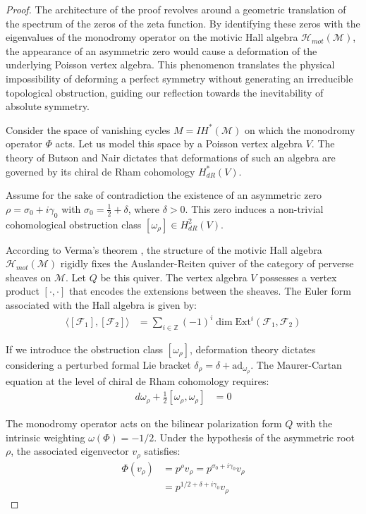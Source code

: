 \documentclass[
]{article}
\begin{document}
\begin{proof}
The architecture of the proof revolves around a geometric translation of the spectrum of the zeros of the zeta function. By identifying these zeros with the eigenvalues of the monodromy operator on the motivic Hall algebra $\mathcal{H}_{mot}(\mathcal{M})$, the appearance of an asymmetric zero would cause a deformation of the underlying Poisson vertex algebra. This phenomenon translates the physical impossibility of deforming a perfect symmetry without generating an irreducible topological obstruction, guiding our reflection towards the inevitability of absolute symmetry.

Consider the space of vanishing cycles $M = IH^*(\mathcal{M})$ on which the monodromy operator $\Phi$ acts. Let us model this space by a Poisson vertex algebra $V$. The theory of Butson and Nair dictates that deformations of such an algebra are governed by its chiral de Rham cohomology $H^*_{dR}(V)$.

Assume for the sake of contradiction the existence of an asymmetric zero $\rho = \sigma_0 + i \gamma_0$ with $\sigma_0 = \frac{1}{2} + \delta$, where $\delta > 0$. This zero induces a non-trivial cohomological obstruction class $[\omega_\rho] \in H^2_{dR}(V)$.

According to Verma's theorem \cite{verma2026}, the structure of the motivic Hall algebra $\mathcal{H}_{mot}(\mathcal{M})$ rigidly fixes the Auslander-Reiten quiver of the category of perverse sheaves on $\mathcal{M}$. Let $Q$ be this quiver. The vertex algebra $V$ possesses a vertex product $[ \cdot, \cdot ]$ that encodes the extensions between the sheaves. The Euler form associated with the Hall algebra is given by:
\begin{align*}
    \langle [\mathcal{F}_1], [\mathcal{F}_2] \rangle &= \sum_{i \in \mathbb{Z}} (-1)^i \dim \text{Ext}^i(\mathcal{F}_1, \mathcal{F}_2)
\end{align*}

If we introduce the obstruction class $[\omega_\rho]$, deformation theory dictates considering a perturbed formal Lie bracket $\delta_\rho = \delta + \text{ad}_{\omega_\rho}$. The Maurer-Cartan equation at the level of chiral de Rham cohomology requires:
\begin{align*}
    d \omega_\rho + \frac{1}{2} [\omega_\rho, \omega_\rho] &= 0
\end{align*}

The monodromy operator acts on the bilinear polarization form $Q$ with the intrinsic weighting $\omega(\Phi) = -1/2$. Under the hypothesis of the asymmetric root $\rho$, the associated eigenvector $v_\rho$ satisfies:
\begin{align*}
    \Phi(v_\rho) &= p^\rho v_\rho = p^{\sigma_0 + i \gamma_0} v_\rho \\
    &= p^{1/2 + \delta + i \gamma_0} v_\rho
\end{align*}


\end{proof}
\end{document}
